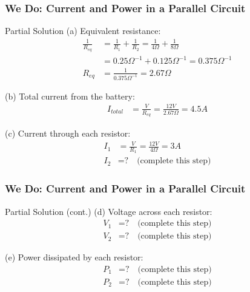 \documentclass{beamer}
\begin{document}
\begin{frame}
    \frametitle{We Do: Current and Power in a Parallel Circuit}
    \begin{block}{Partial Solution}
        (a) Equivalent resistance:
        \begin{align*}
            \frac{1}{R_{eq}} &= \frac{1}{R_1} + \frac{1}{R_2} = \frac{1}{4\Omega} + \frac{1}{8\Omega}\\
            &= 0.25\Omega^{-1} + 0.125\Omega^{-1} = 0.375\Omega^{-1}\\
            R_{eq} &= \frac{1}{0.375\Omega^{-1}} = 2.67\Omega
        \end{align*}
        
        (b) Total current from the battery:
        \begin{align*}
            I_{total} &= \frac{V}{R_{eq}} = \frac{12V}{2.67\Omega} = 4.5A
        \end{align*}
        
        (c) Current through each resistor:
        \begin{align*}
            I_1 &= \frac{V}{R_1} = \frac{12V}{4\Omega} = 3A\\
            I_2 &= \text{?} \quad \text{(complete this step)}
        \end{align*}
    \end{block}
\end{frame}

\begin{frame}
    \frametitle{We Do: Current and Power in a Parallel Circuit}
    \begin{block}{Partial Solution (cont.)}
        (d) Voltage across each resistor:
        \begin{align*}
            V_1 &= \text{?} \quad \text{(complete this step)}\\
            V_2 &= \text{?} \quad \text{(complete this step)}
        \end{align*}
        
        (e) Power dissipated by each resistor:
        \begin{align*}
            P_1 &= \text{?} \quad \text{(complete this step)}\\
            P_2 &= \text{?} \quad \text{(complete this step)}
        \end{align*}
    \end{block}
\end{frame}
\end{document}
